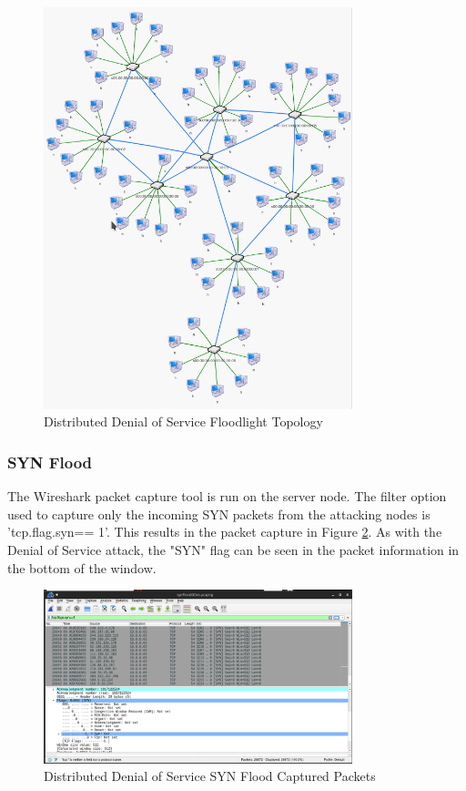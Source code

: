 \begin{figure}[H]
	\centering
	\includegraphics[width=0.8\textwidth]{images/flDDoS}
	\caption{Distributed Denial of Service Floodlight Topology}
	\label{fig:images-flDDoS}
\end{figure}

\subsubsection{SYN Flood}

The Wireshark packet capture tool is run on the server node. The filter option
used to capture only the incoming SYN packets from the attacking nodes is
'tcp.flag.syn== 1'. This results in the packet capture in Figure
\ref{fig:images-synFloodDDoSWs}. As with the Denial of Service attack, the "SYN"
flag can be seen in the packet information in the bottom of the window.

\begin{figure}[H]
	\centering
	\includegraphics[width=0.8\textwidth]{images/synFloodDDoSWS}
	\caption{Distributed Denial of Service SYN Flood Captured Packets}
	\label{fig:images-synFloodDDoSWs}
\end{figure}

